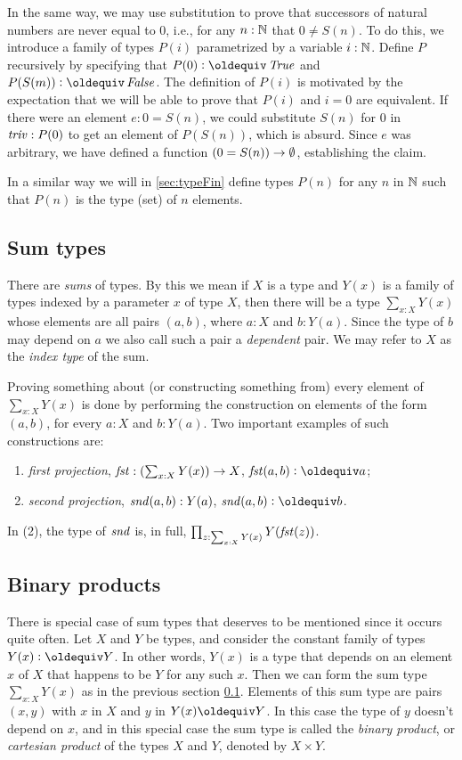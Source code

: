 In the same way, we may use substitution to prove that successors of natural numbers are never equal to $0$, i.e., for any $n:\mathbb{N}$ that $0 \ne
S(n)$.  To do this, we introduce a family of types $P(i)$ parametrized by a variable $i:\mathbb{N}$.  Define $P$ recursively by specifying that $P(0)
\defeq \true$ and $P(S(m)) \defeq \false$.  The definition of $P(i)$ is motivated by the expectation that we will be able to prove that $P(i)$
and $i = 0$ are equivalent.  If there were an element $e: 0 = S(n)$, we could substitute $S(n)$ for $0$ in $\mathop{\mathit{triv}} : P ( 0 )$ to get an element
of $P(S(n))$, which is absurd.  Since $e$ was arbitrary, we have defined a function $(0=S(n)) \to \emptyset$, establishing the claim.

In a similar way we will in \cref{sec:typeFin} define types $P(n)$ for any $n$ in $\mathbb{N}$
such that $P(n)$ is the type (set) of $n$ elements.

\subsection{Sum types}
\label{sec:sum-types}
There are \emph{sums} of types.  By this we mean if $X$ is a type and $Y(x)$ is a family of types indexed by a parameter $x$ of type $X$, then
there will be a type $\sum _{x:X} Y(x)$ whose elements are all pairs $(a,b)$, where $a:X$ and $b:Y(a)$. Since the type of $b$ may depend on $a$ we also call such a pair
a \emph{dependent} pair. We may refer to $X$ as the \emph{index
  type} of the sum.  

Proving something about (or constructing something from) every 
element of $\sum _{x:X} Y(x)$ is done by performing the construction on elements of the form $(a,b)$, for every $a:X$ and $b: Y(a)$.
Two important examples of such constructions are:
\begin{enumerate}
\item \emph{first projection}, 
$\mathop{\mathit{fst}}:(\sum _{x:X} Y(x)) \to X$, 
$\fst(a,b)\defeq a$;
\item \emph{second projection},
$\mathop{\mathit{snd}}(a,b): Y(a)$,
$\snd(a,b)\defeq b$.
\end{enumerate}
In (2), the type of $\mathop{\mathit{snd}}$ is, in full,
$\prod_{z:\sum_{x:X} Y(x)} Y(\mathop{\mathit{fst}}(z))$.

\subsection{Binary products}
\label{sec:binprod-types}
There is special case of sum types that deserves to be mentioned since
it occurs quite often. Let $X$ and $Y$ be types, and consider the constant
family of types $Y(x)\defeq Y$. In other words, $Y(x)$ is a type that depends
on an element $x$ of $X$ that happens to be $Y$ for any such $x$.
Then we can form the sum type $\sum_{x:X} Y(x)$ as in the previous
section \ref{sec:sum-types}. Elements of this sum type are pairs $(x,y)$
with $x$ in $X$ and $y$ in $Y(x)\jdeq Y$. In this case the type of $y$
doesn't depend on $x$, and in this special case the sum type is called
the \emph{binary product}, or \emph{cartesian product} of the types $X$ and $Y$,
denoted by $X \times Y$.

